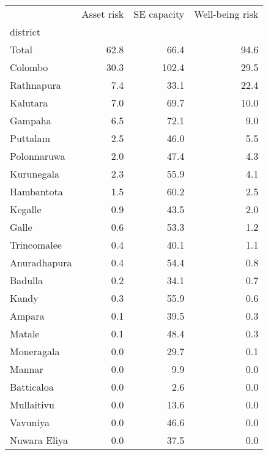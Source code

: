 \begin{tabular}{lrrr}
\toprule
{} &  Asset risk &  SE capacity &  Well-being risk \\
district     &             &              &                  \\
\midrule
Total        &        62.8 &         66.4 &             94.6 \\
Colombo      &        30.3 &        102.4 &             29.5 \\
Rathnapura   &         7.4 &         33.1 &             22.4 \\
Kalutara     &         7.0 &         69.7 &             10.0 \\
Gampaha      &         6.5 &         72.1 &              9.0 \\
Puttalam     &         2.5 &         46.0 &              5.5 \\
Polonnaruwa  &         2.0 &         47.4 &              4.3 \\
Kurunegala   &         2.3 &         55.9 &              4.1 \\
Hambantota   &         1.5 &         60.2 &              2.5 \\
Kegalle      &         0.9 &         43.5 &              2.0 \\
Galle        &         0.6 &         53.3 &              1.2 \\
Trincomalee  &         0.4 &         40.1 &              1.1 \\
Anuradhapura &         0.4 &         54.4 &              0.8 \\
Badulla      &         0.2 &         34.1 &              0.7 \\
Kandy        &         0.3 &         55.9 &              0.6 \\
Ampara       &         0.1 &         39.5 &              0.3 \\
Matale       &         0.1 &         48.4 &              0.3 \\
Moneragala   &         0.0 &         29.7 &              0.1 \\
Mannar       &         0.0 &          9.9 &              0.0 \\
Batticaloa   &         0.0 &          2.6 &              0.0 \\
Mullaitivu   &         0.0 &         13.6 &              0.0 \\
Vavuniya     &         0.0 &         46.6 &              0.0 \\
Nuwara Eliya &         0.0 &         37.5 &              0.0 \\
\bottomrule
\end{tabular}
